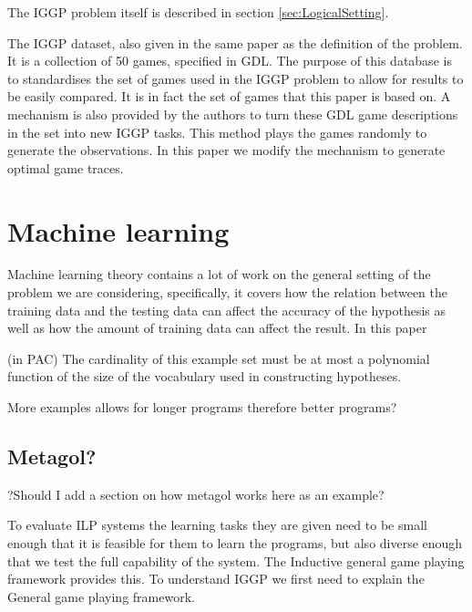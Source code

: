 
The IGGP problem itself is described in section \ref{sec:LogicalSetting}.

The IGGP dataset, also given in the same paper as the definition of the problem. It is a collection of 50 games, specified in GDL. The purpose of this database is to standardises the set of games used in the IGGP problem to allow for results to be easily compared. It is in fact the set of games that this paper is based on. 
A mechanism is also provided by the authors to turn these GDL game descriptions in the set into new IGGP tasks. This method plays the games randomly to generate the observations. In this paper we modify the mechanism to generate optimal game traces.






\section{Machine learning}
Machine learning theory contains a lot of work on the general setting of the problem we are considering, specifically, it covers how the relation between the training data and the testing data can affect the accuracy of the hypothesis as well as how the amount of training data can affect the result. In this paper

(in PAC) The cardinality of this example set must be at most a polynomial function of the size of the vocabulary used in constructing hypotheses.

More examples allows for longer programs therefore better programs?



\subsection{Metagol?}
?Should I add a section on how metagol works here as an example?


To evaluate ILP systems the learning tasks they are given need to be small enough that it is feasible for them to learn the programs, but also diverse enough that we test the full capability of the system. The Inductive general game playing framework provides this. To understand IGGP we first need to explain the General game playing framework.


